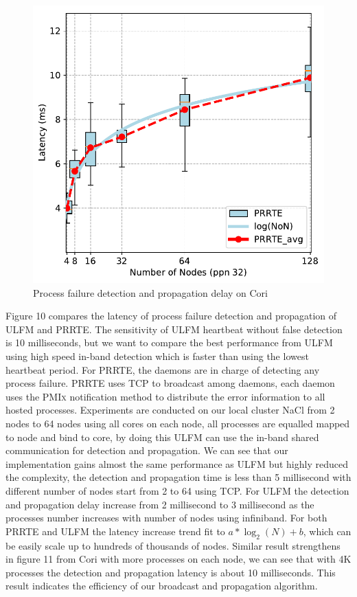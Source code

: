 \documentclass[sigconf]{acmart}
\newcommand{\prrte}[0]{\textsc{PRRTE}\xspace}
\newcommand{\pmix}[0]{\textsc{PMIx}\xspace}
\newcommand{\ulfm}[0]{\textsc{ULFM}\xspace}
\begin{document}
\begin{figure}[h]
  \centering
  \includegraphics[width=\linewidth]{Cori_Process_Failure_fit.pdf}
  \caption{Process failure detection and propagation delay on Cori}
\end{figure}

Figure 10 compares the latency of process failure detection and propagation of \ulfm and \prrte. The sensitivity of \ulfm heartbeat without false detection is 10 milliseconds, but we want to compare the best performance from \ulfm using high speed in-band detection which is faster than using the lowest heartbeat period. For \prrte, the daemons are in charge of detecting any process failure. \prrte uses TCP to broadcast among daemons, each daemon uses the \pmix notification method to distribute the error information to all hosted processes. Experiments are conducted on our local cluster NaCl from 2 nodes to 64 nodes using all cores on each node, all processes are equalled mapped to node and bind to core, by doing this \ulfm can use the in-band shared communication for detection and propagation. We can see that our implementation gains almost the same performance as \ulfm but highly reduced the complexity, the detection and propagation time is less than 5 millisecond with different number of nodes start from 2 to 64 using TCP. For \ulfm the detection and propagation delay increase from 2 millisecond to 3 millisecond as the processes number increases with number of nodes using infiniband. For both \prrte and \ulfm the latency increase trend fit to $ a*\log_2(N) + b $, which can be easily scale up to hundreds of thousands of nodes. Similar result strengthens in figure 11 from Cori with more processes on each node, we can see that with 4K processes the detection and propagation latency is about 10 milliseconds. This result indicates the efficiency of our broadcast and propagation algorithm.  
\end{document}
